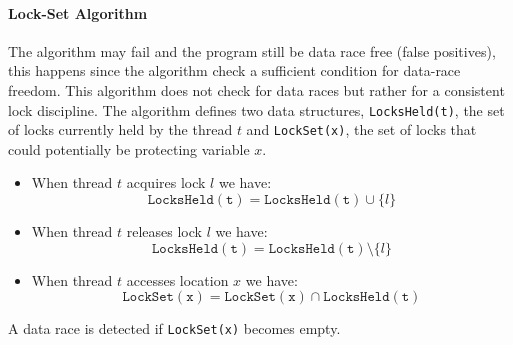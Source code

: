 \paragraph{Lock-Set Algorithm}
The algorithm may fail and the program still be data race free (false positives),
this happens since the algorithm check a sufficient condition for data-race freedom.
This algorithm does not check for data races but rather for a consistent lock discipline.
The algorithm defines two data structures, \texttt{LocksHeld(t)}, the set of locks currently held by the thread $t$ and
\texttt{LockSet(x)}, the set of locks that could potentially be protecting variable $x$.
\begin{itemize}
  \item When thread $t$ acquires lock $l$ we have:$$\mathtt{LocksHeld(t)} = \mathtt{LocksHeld(t)} \cup \{l\}$$
  \item When thread $t$ releases lock $l$ we have:$$\mathtt{LocksHeld(t)} = \mathtt{LocksHeld(t)} \setminus \{l\}$$
  \item When thread $t$ accesses location $x$ we have:$$\mathtt{LockSet(x)} = \mathtt{LockSet(x)} \cap \mathtt{LocksHeld(t)}$$
\end{itemize}
A data race is detected if \texttt{LockSet(x)} becomes empty.